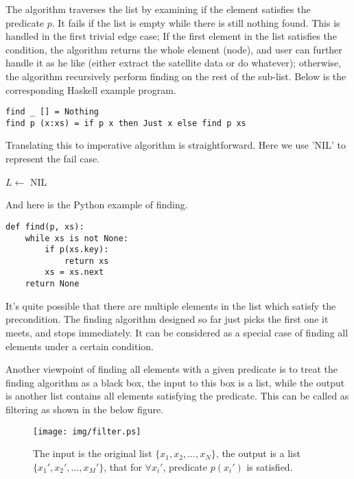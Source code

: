 \documentclass{article}
\begin{document}
The algorithm traverses the list by examining if the element satisfies the predicate $p$. It
fails if the list is empty while there is still nothing found. This is handled in the first
trivial edge case; If the first element in the list satisfies the condition, the algorithm
returns the whole element (node), and user can further handle it as he like (either extract 
the satellite data or do whatever); otherwise, the algorithm recursively perform finding
on the rest of the sub-list. Below is the corresponding Haskell example program. 

\lstset{language=Haskell}
\begin{lstlisting}
find _ [] = Nothing
find p (x:xs) = if p x then Just x else find p xs
\end{lstlisting}

Translating this to imperative algorithm is straightforward. Here we use 'NIL' to represent
the fail case.

\begin{algorithmic}
      \State \Return {}
    \EndIf
    \State $L \gets$ 
  \EndWhile
  \State \Return NIL
\EndFunction
\end{algorithmic}

And here is the Python example of finding.

\lstset{language=Python}
\begin{lstlisting}
def find(p, xs):
    while xs is not None:
        if p(xs.key):
            return xs
        xs = xs.next
    return None      
\end{lstlisting}

It's quite possible that there are multiple elements in the list which satisfy the precondition.
The finding algorithm designed so far just picks the first one it meets, and stops immediately.
It can be considered as a special case of finding all elements under a certain condition.

Another viewpoint of finding all elements with a given predicate is to treat the finding algorithm
as a black box, the input to this box is a list, while the output is another list contains
all elements satisfying the predicate. This can be called as filtering as shown in the below
figure.

\begin{figure}[htbp]
        \centering
        \texttt{[image: img/filter.ps]}
        \caption{The input is the original list $\{x_1, x_2, ..., x_N\}$, the output is a list $\{x_1', x_2', ..., x_M'\}$, that for $\forall x_i'$, predicate $p(x_i')$ is satisfied.} \label{fig:filter}
\end{figure}
\end{document}
